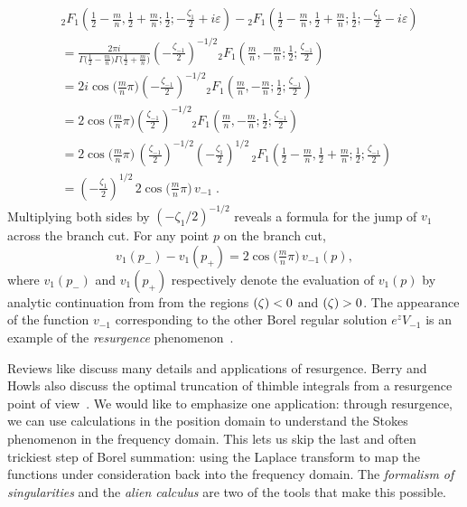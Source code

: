\documentclass{article}
\let\Im\relax
\DeclareMathOperator{\Im}{Im}
\theoremstyle{definition}
\theoremstyle{plain}
\newenvironment{old}{\color{RoyalBlue}}{\color{black}}
\begin{document}
\begin{align*}
&{}_2F_1\left(\frac{1}{2}-\frac{m}{n},\frac{1}{2}+\frac{m}{n};\frac{1}{2};-\frac{\zeta_1}{2}+i\varepsilon\right)-{}_2F_1\left(\frac{1}{2}-\frac{m}{n},\frac{1}{2}+\frac{m}{n};\frac{1}{2};-\frac{\zeta_1}{2}-i\varepsilon\right) \\
&=\frac{2\pi i}{\Gamma\big(\tfrac{1}{2}-\tfrac{m}{n}\big)\Gamma\big(\tfrac{1}{2}+\tfrac{m}{n}\big)} \left(-\frac{\zeta_{-1}}{2}\right)^{-1/2} {}_2F_1\left(\frac{m}{n},-\frac{m}{n};\frac{1}{2};\frac{\zeta_{-1}}{2}\right) \\
&=2i\cos\big(\tfrac{m}{n}\pi\big) \left(-\frac{\zeta_{-1}}{2}\right)^{-1/2} {}_2F_1\left(\frac{m}{n},-\frac{m}{n};\frac{1}{2};\frac{\zeta_{-1}}{2}\right) \\
&=2\cos\big(\tfrac{m}{n}\pi\big) \left(\frac{\zeta_{-1}}{2}\right)^{-1/2} {}_2F_1\left(\frac{m}{n},-\frac{m}{n};\frac{1}{2};\frac{\zeta_{-1}}{2}\right) \\
&=2\cos\big(\tfrac{m}{n}\pi\big)\, \left(\frac{\zeta_{-1}}{2}\right)^{-1/2} \left(-\frac{\zeta_{1}}{2}\right)^{1/2}\, {}_2F_1\left(\frac{1}{2}-\frac{m}{n},\frac{1}{2}+\frac{m}{n};\frac{1}{2};\frac{\zeta_{-1}}{2}\right) \\
&=\left(-\frac{\zeta_{1}}{2}\right)^{1/2}\,2\cos\big(\tfrac{m}{n}\pi\big)\,v_{-1}\;.
\end{align*}
Multiplying both sides by $(-\zeta_1/2)^{-1/2}$ reveals a formula for the jump of $v_1$ across the branch cut. For any point $p$ on the branch cut,
\begin{equation}\label{eqn:resurg-rel-1}
v_1(p_-) - v_1(p_+) = 2\cos\big(\tfrac{m}{n}\pi\big)\,v_{-1}(p),
\end{equation}
where $v_1(p_-)$ and $v_1(p_+)$ respectively denote the evaluation of $v_1(p)$ by analytic continuation from from the regions $\Im(\zeta) < 0$ and $\Im(\zeta) > 0$. The appearance of the function $v_{-1}$ corresponding to the other Borel regular solution $e^z V_{-1}$ is an example of the {\em resurgence} phenomenon~\cite{EcalleI,EcalleII,EcalleIII}.

Reviews like \cite{diverg-resurg-i,Dorigoni,aniceto2019primer} discuss many details and applications of resurgence. Berry and Howls also discuss the optimal truncation of thimble integrals from a resurgence point of view~\cite{Berry_Howls}. We would like to emphasize one application: through resurgence, we can use calculations in the position domain to understand the Stokes phenomenon in the frequency domain. This lets us skip the last and often trickiest step of Borel summation: using the Laplace transform to map the functions under consideration back into the frequency domain. The {\em formalism of singularities} and the {\em alien calculus} are two of the tools that make this possible.
\end{document}
